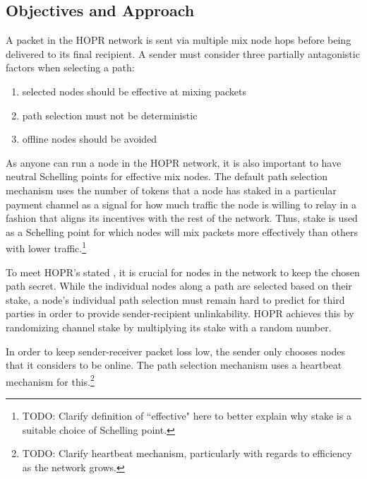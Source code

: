 \subsection{Objectives and Approach}
A packet in the HOPR network is sent via multiple mix node hops before being delivered to its final recipient. A sender must consider three partially antagonistic factors when selecting a path:

\begin{enumerate}
    \item selected nodes should be effective at mixing packets
    \item path selection must not be deterministic
    \item offline nodes should be avoided
\end{enumerate}

As anyone can run a node in the HOPR network, it is also important to have neutral Schelling points for effective mix nodes. The default path selection mechanism uses the number of tokens that a node has staked in a particular payment channel as a signal for how much traffic the node is willing to relay in a fashion that aligns its incentives with the rest of the network. Thus, stake is used as a Schelling point for which nodes will mix packets more effectively than others with lower traffic.\footnote{TODO: Clarify definition of ``effective" here to better explain why stake is a suitable choice of Schelling point.}

To meet HOPR's stated , it is crucial for nodes in the network to keep the chosen path secret. While the individual nodes along a path are selected based on their stake, a node's individual path selection must remain hard to predict for third parties in order to provide sender-recipient unlinkability. HOPR achieves this by randomizing channel stake by multiplying its stake with a random number.

In order to keep sender-receiver packet loss low, the sender only chooses nodes that it considers to be online. The path selection mechanism uses a heartbeat mechanism for this.\footnote{TODO: Clarify heartbeat mechanism, particularly with regards to efficiency as the network grows.}